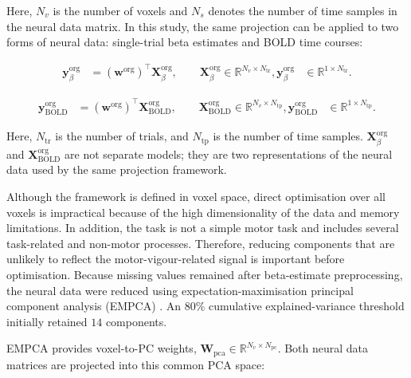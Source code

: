 \documentclass[utf8]{frontiers_suppmat}
\begin{document}
Here, \(N_v\) is the number of voxels and \(N_s\) denotes the number of time samples in the neural data matrix. In this study, the same projection can be applied to two forms of neural data: single-trial beta estimates and BOLD time courses:

\begin{equation*}
\begin{aligned}
\mathbf{y}_{\beta}^{\mathrm{org}}
&=
\left(\mathbf{w}^{\mathrm{org}}\right)^\top
\mathbf{X}_{\beta}^{\mathrm{org}},
\qquad
\mathbf{X}_{\beta}^{\mathrm{org}} \in \mathbb{R}^{N_v \times N_{\mathrm{tr}}},
\mathbf{y}_{\beta}^{\mathrm{org}}
&\in \mathbb{R}^{1 \times N_{\mathrm{tr}}}.
\end{aligned}
\label{eq:y_beta_org}
\end{equation*}

\begin{equation*}
\begin{aligned}
\mathbf{y}_{\mathrm{BOLD}}^{\mathrm{org}}
&=
\left(\mathbf{w}^{\mathrm{org}}\right)^\top
\mathbf{X}_{\mathrm{BOLD}}^{\mathrm{org}},
\qquad
\mathbf{X}_{\mathrm{BOLD}}^{\mathrm{org}} \in
\mathbb{R}^{N_v \times N_{\mathrm{tp}}},
\mathbf{y}_{\mathrm{BOLD}}^{\mathrm{org}}
&\in \mathbb{R}^{1 \times N_{\mathrm{tp}}}.
\end{aligned}
\label{eq:y_bold_org}
\end{equation*}

Here, $N_{\mathrm{tr}}$ is the number of trials, and \(N_{\mathrm{tp}}\) is the number of time
samples. \(\mathbf{X}_{\beta}^{\mathrm{org}}\) and
\(\mathbf{X}_{\mathrm{BOLD}}^{\mathrm{org}}\) are not separate models; they are two
representations of the neural data used by the same projection framework.

Although the framework is defined in voxel space, direct optimisation over all voxels is impractical because of the high dimensionality of the data and memory limitations. In addition, the task is not a simple motor task and includes several task-related and non-motor processes. Therefore, reducing components that are unlikely to reflect the motor-vigour-related signal is important before optimisation. Because missing values remained after beta-estimate preprocessing, the neural data were reduced using expectation-maximisation principal component analysis (EMPCA) \citep{roweis1997algorithms}. An \(80\%\) cumulative explained-variance threshold initially retained $14$ components.

EMPCA provides voxel-to-PC weights,
\(\mathbf{W}_{\mathrm{pca}} \in \mathbb{R}^{N_v \times N_{\mathrm{pc}}}\). Both neural
data matrices are projected into this common PCA space:
\end{document}
